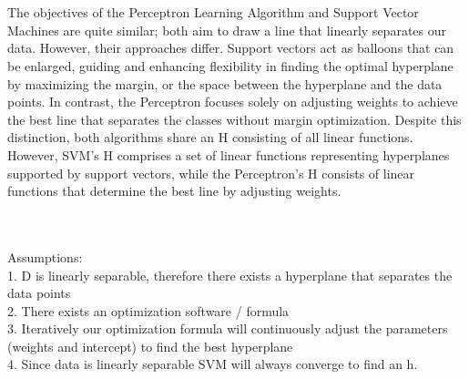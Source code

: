 \documentclass[12pt]{article}
\begin{document}
\begin{enumerate}

 \\ 
 \\
The objectives of the Perceptron Learning Algorithm and Support Vector Machines are quite similar; both aim to draw a line that linearly separates our data. However, their approaches differ. Support vectors act as balloons that can be enlarged, guiding and enhancing flexibility in finding the optimal hyperplane by maximizing the margin, or the space between the hyperplane and the data points. In contrast, the Perceptron focuses solely on adjusting weights to achieve the best line that separates the classes without margin optimization. Despite this distinction, both algorithms share an H consisting of all linear functions. However, SVM's H comprises a set of linear functions representing hyperplanes supported by support vectors, while the Perceptron's 
H consists of linear functions that determine the best line by adjusting weights.







 \\ 
 \\ 
Assumptions: \\
1. D is linearly separable, therefore there exists a hyperplane that separates the data points \\
2. There exists an optimization software / formula \\
3. Iteratively our optimization formula will continuously adjust the parameters (weights and intercept) to find the best hyperplane \\
4. Since data is linearly separable SVM will always converge to find an h.\\




\end{enumerate}
\end{document}
